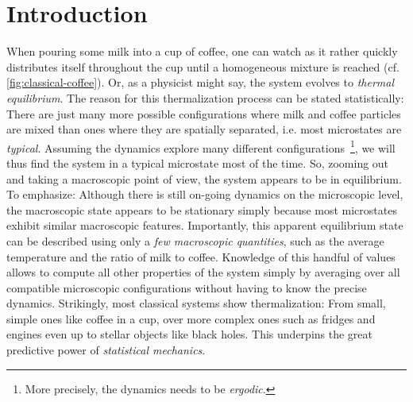 \chapter*{Introduction}
\label{pt:introduction}
When pouring some milk into a cup of coffee, one can watch as it rather quickly distributes itself throughout the cup until a homogeneous mixture is reached (cf. \autoref{fig:classical-coffee}). Or, as a physicist might say, the system evolves to \emph{thermal equilibrium}. The reason for this thermalization process can be stated statistically: There are just many more possible configurations where milk and coffee particles are mixed than ones where they are spatially separated, i.e. most microstates are \emph{typical}. Assuming the dynamics explore many different configurations~\footnote{More precisely, the dynamics needs to be \emph{ergodic}.},
we will thus find the system in a typical microstate most of the time. So, zooming out and taking a macroscopic point of view, the system appears to be in equilibrium. To emphasize: Although there is still on-going dynamics on the microscopic level, the macroscopic state appears to be stationary simply because most microstates exhibit similar macroscopic features. Importantly, this apparent equilibrium state can be described using only a \emph{few macroscopic quantities}, such as the average temperature and the ratio of milk to coffee.
Knowledge of this handful of values allows to compute all other properties of the system simply by averaging over all compatible microscopic configurations without having to know the precise dynamics. Strikingly, most classical systems show thermalization: From small, simple ones like coffee in a cup, over more complex ones such as fridges and engines even up to stellar objects like black holes. This underpins the great predictive power of \emph{statistical mechanics}.
